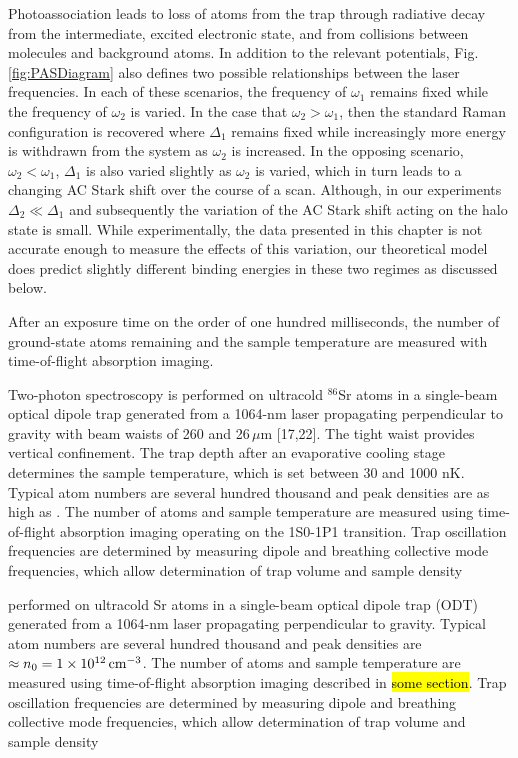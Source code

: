 Photoassociation leads to loss of atoms from the trap through radiative decay from the intermediate, excited electronic state, and from collisions between molecules and background atoms.
In addition to the relevant potentials, Fig.\,\ref{fig:PASDiagram} also defines two possible relationships  between the laser frequencies.
In each of these scenarios, the frequency of $\omega_1$ remains fixed while the frequency of $\omega_2$ is varied.
In the case that $\omega_2 > \omega_1$, then the standard Raman configuration is recovered where $\Delta_1$ remains fixed while increasingly more energy is withdrawn from the system as $\omega_2$ is increased.
In the opposing scenario, $\omega_2 < \omega_1$, $\Delta_1$ is also varied slightly as $\omega_2$ is varied, which in turn leads to a changing AC Stark shift over the course of a scan.
Although, in our experiments $\Delta_2 \ll \Delta_1$ and subsequently the variation of the AC Stark shift acting on the halo state is small.
While experimentally, the data presented in this chapter is not accurate enough to measure the effects of this variation, our theoretical model does predict slightly different binding energies in these two regimes as discussed below.
 
After an exposure time on the order of one hundred milliseconds, the number of ground-state atoms remaining and the sample temperature are measured with time-of-flight absorption imaging.

Two-photon spectroscopy is performed on ultracold $^{86}$Sr atoms in a single-beam optical dipole trap generated from a 1064-nm laser propagating perpendicular to gravity with beam waists of 260 and 26\,$\mu$m [17,22].
The tight waist provides vertical confinement.
The trap depth after an evaporative cooling stage determines the sample temperature, which is set between 30 and 1000 nK.
Typical atom numbers are several hundred thousand and peak densities are as high as .
The number of atoms and sample temperature are measured using time-of-flight absorption imaging operating on the 1S0-1P1 transition.
Trap oscillation frequencies are determined by measuring dipole and breathing collective mode frequencies, which allow determination of trap volume and sample density

 performed on ultracold Sr atoms in a single-beam optical dipole trap (ODT) generated from a 1064-nm laser propagating perpendicular to gravity.
 Typical atom numbers are several hundred thousand and peak densities are $\approx n_0 = 1 \times 10^{12} \, \text{cm}^{-3}$.
 The number of atoms and sample temperature are measured using time-of-flight absorption imaging described in \hl{some section}.
 Trap oscillation frequencies are determined by measuring dipole and breathing collective mode frequencies, which allow determination of trap volume and sample density
 
